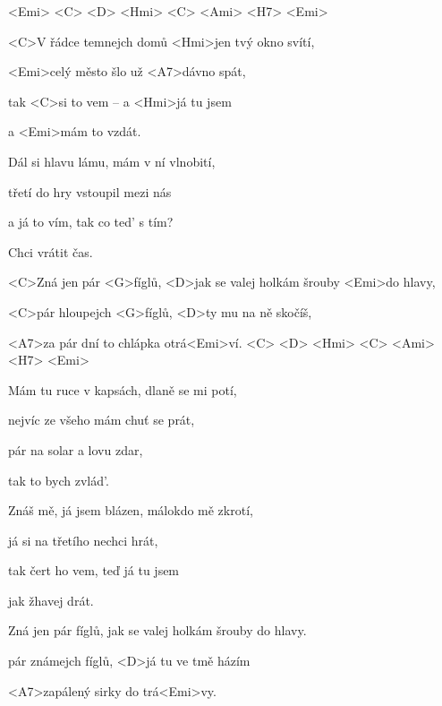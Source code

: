 

<Emi> <C> <D> <Hmi> <C> <Ami> <H7> <Emi>

\zs
<C>V řádce temnejch domů <Hmi>jen tvý okno svítí,

<Emi>celý město šlo už <A7>dávno spát,

tak <C>si to vem -- a <Hmi>já tu jsem

a <Emi>mám to vzdát.
\ks

\zs
Dál si hlavu lámu, mám v ní vlnobití,

třetí do hry vstoupil mezi nás

a já to vím, tak co ted’ s tím?

Chci vrátit čas.
\ks

\zr
<C>Zná jen pár <G>fíglů,
<D>jak se valej holkám šrouby <Emi>do hlavy,

<C>pár hloupejch <G>fíglů,
<D>ty mu na ně skočíš,

<A7>za pár dní to chlápka otrá<Emi>ví.
<C> <D> <Hmi> <C> <Ami> <H7> <Emi>
\kr

\zs
Mám tu ruce v kapsách, dlaně se mi potí,

nejvíc ze všeho mám chuť se prát,

pár na solar a lovu zdar,

tak to bych zvlád'.
\ks

\zs
Znáš mě, já jsem blázen, málokdo mě zkrotí,

já si na třetího nechci hrát,

tak čert ho vem, teď já tu jsem

jak žhavej drát.
\ks

\zr \kr

\zr
Zná jen pár fíglů,
jak se valej holkám šrouby do hlavy.

pár známejch fíglů,
<D>já tu ve tmě házím

<A7>zapálený sirky do trá<Emi>vy.
\kr

\kp
